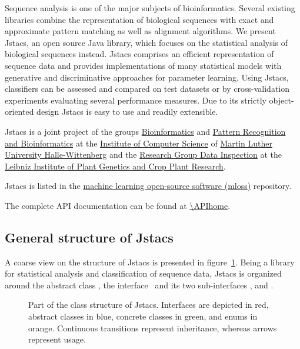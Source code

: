 Sequence analysis is one of the major subjects of bioinformatics. Several existing libraries combine the representation of biological sequences with exact and approximate pattern matching as well as alignment algorithms. We present Jstacs, an open source Java library, which focuses on the statistical analysis of biological sequences instead. Jstacs comprises an efficient representation of sequence data and provides implementations of many statistical models with generative and discriminative approaches for parameter learning. Using Jstacs, classifiers can be assessed and compared on test datasets or by cross-validation experiments evaluating several performance measures. Due to its strictly object-oriented design Jstacs is easy to use and readily extensible.

Jstacs is a joint project of the groups \href{http://www.informatik.uni-halle.de/arbeitsgruppen/bioinformatik/}{Bioinformatics} and \href{http://www.informatik.uni-halle.de/arbeitsgruppen/mustererkennung/}{Pattern Recognition and Bioinformatics} at the \href{http://www.informatik.uni-halle.de/}{Institute of Computer Science} of \href{http://www.uni-halle.de/}{Martin Luther University Halle-Wittenberg} and the \href{http://dig.ipk-gatersleben.de/}{Research Group Data Inspection} at the \href{http://www.ipk-gatersleben.de/}{Leibniz Institute of Plant Genetics and Crop Plant Research}.

Jstacs is listed in the \href{http://mloss.org/software/}{machine learning open-source software (mloss)} repository.

The complete API documentation can be found at \url{\APIhome}.

\subsection{General structure of Jstacs}

A coarse view on the structure of Jstacs is presented in figure~\ref{fig:classes}.
Being a library for statistical analysis and classification of sequence data, Jstacs is organized around the abstract class \AbstractClassifier, the interface \StatMod~and its two sub-interfaces \TrainSM, and \DiffSM.

\begin{figure}

\caption{Part of the class structure of Jstacs. Interfaces are depicted in red, abstract classes in blue, concrete classes in green, and enums in orange. Continuous transitions represent inheritance, whereas arrows represent usage. \label{fig:classes}}
\end{figure}

